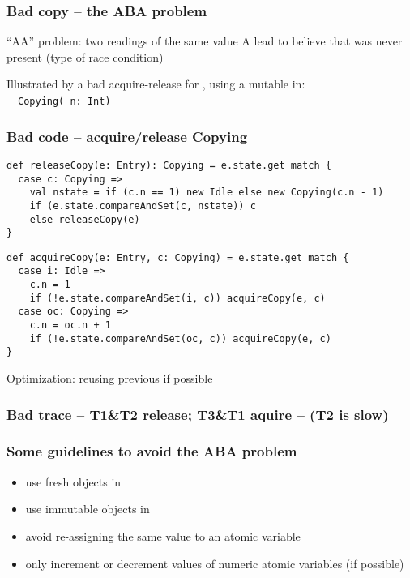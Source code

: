 \documentclass[aspectratio=169]{beamer}
\begin{document}
\begin{frame}\frametitle{Bad copy -- the ABA problem}
\alert{``AA'' problem}: two readings of the same value \alert{A} lead to believe that  was never present (type of race condition)

\bigskip

Illustrated by a bad acquire-release for , using a mutable  in:
\\~~\alert{\texttt{Copying( n: Int)}}
\end{frame}


\begin{frame}[fragile]\frametitle{Bad code -- acquire/release Copying}
\label{slide:badcopy}
    
\begin{lstlisting}[emph={execute,sleep,log,logMessage,compareAndSet,releaseCopy}]
def releaseCopy(e: Entry): Copying = e.state.get match {
  case c: Copying =>
    val nstate = if (c.n == 1) new Idle else new Copying(c.n - 1)
    if (e.state.compareAndSet(c, nstate)) c
    else releaseCopy(e)
}
\end{lstlisting}
\begin{lstlisting}[emph={execute,sleep,log,logMessage,compareAndSet,acquireCopy}]
def acquireCopy(e: Entry, c: Copying) = e.state.get match {
  case i: Idle =>
    c.n = 1
    if (!e.state.compareAndSet(i, c)) acquireCopy(e, c)
  case oc: Copying =>
    c.n = oc.n + 1
    if (!e.state.compareAndSet(oc, c)) acquireCopy(e, c)
}
\end{lstlisting}
Optimization: reusing previous  if possible
\end{frame}


\begin{frame}\frametitle{Bad trace -- T1\&T2 release; T3\&T1 aquire -- (T2 is slow)}
\end{frame}


\begin{frame}\frametitle{Some guidelines to avoid the ABA problem}
  \begin{itemize}
    \item use fresh objects in 
    \item use immutable objects in 
    \item avoid re-assigning the same value to an atomic variable
    \item only increment or decrement values of numeric atomic variables (if possible)
  \end{itemize}


\end{frame}
\end{document}
